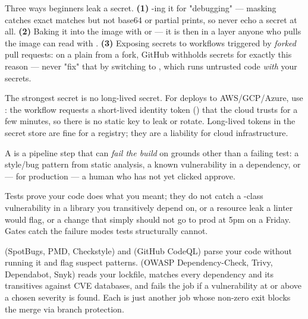 \begin{secwarn}
Three ways beginners leak a secret. \textbf{(1)} -ing it for "debugging" --- masking catches exact matches but not base64 or partial prints, so never echo a secret at all. \textbf{(2)} Baking it into the image with  or  --- it is then in a layer anyone who pulls the image can read with . \textbf{(3)} Exposing secrets to workflows triggered by \emph{forked} pull requests: on a plain  from a fork, GitHub withholds secrets for exactly this reason --- never "fix" that by switching to , which runs untrusted code \emph{with} your secrets.
\end{secwarn}

\begin{prodtip}
The strongest secret is no long-lived secret. For deploys to AWS/GCP/Azure, use : the workflow requests a short-lived identity token () that the cloud trusts for a few minutes, so there is no static key to leak or rotate. Long-lived tokens in the secret store are fine for a registry; they are a liability for cloud infrastructure.
\end{prodtip}


 A  is a pipeline step that can \emph{fail the build} on grounds other than a failing test: a style/bug pattern from static analysis, a known vulnerability in a dependency, or --- for production --- a human who has not yet clicked approve.

 Tests prove your code does what you meant; they do not catch a -class vulnerability in a library you transitively depend on, or a resource leak a linter would flag, or a change that simply should not go to prod at 5pm on a Friday. Gates catch the failure modes tests structurally cannot.

  (SpotBugs, PMD, Checkstyle) and  (GitHub CodeQL) parse your code without running it and flag suspect patterns.  (OWASP Dependency-Check, Trivy, Dependabot, Snyk) reads your lockfile, matches every dependency and its transitives against CVE databases, and fails the job if a vulnerability at or above a chosen severity is found. Each is just another job whose non-zero exit blocks the merge via branch protection.

